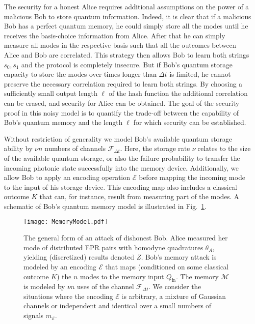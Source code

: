 \documentclass[aps,amsfonts,twoside,amssymb,superscriptaddress,twocolumn]{revtex4-1}
\newcommand*{\cE}{\mathcal{E}}
\newcommand*{\cF}{\mathcal{F}}
\newcommand*{\cM}{\mathcal{M}}
\newcommand*{\inn}{\textrm{in}}
\begin{document}
The security for a honest Alice requires additional assumptions on the power of a malicious Bob to store quantum information. 
Indeed, it is clear that if a malicious Bob has a perfect quantum memory, he could simply store all the modes until he receives the basis-choice information from Alice. 
After that he can simply measure all modes in the respective basis such that all the outcomes between Alice and Bob are correlated. 
This strategy then allows Bob to learn both strings $s_0,s_1$ and the protocol is completely insecure. 
But if Bob's quantum storage capacity to store the modes over times longer than $\Delta t$ is limited, he cannot preserve the necessary correlation required to learn both strings.
By choosing a sufficiently small output length $\ell$ of the hash function the additional correlation can be erased, and security for Alice can be obtained. 
The goal of the security proof in this noisy model is to quantify the trade-off between the capability of Bob's quantum memory and the length $\ell$ for which security can be established. 

Without restriction of generality we model Bob's available quantum storage ability by $\nu n$ numbers of channels $\cF_{\Delta t}$. Here, the storage rate $\nu$ relates to the size of the available quantum storage, or also the failure probability to transfer the incoming photonic state successfully into the memory device. Additionally, we allow Bob to apply an encoding operation $\cE$ before mapping the incoming mode to the input of his storage device. This encoding map also includes a classical outcome $K$ that can, for instance, result from measuring part of the modes. A schematic of Bob's quantum memory model is illustrated in Fig.~\ref{fig:Memory}. 

\begin{figure}
    \begin{center}
        \texttt{[image: MemoryModel.pdf]}
        \caption{The general form of an attack of dishonest Bob. Alice measured her mode of distributed EPR pairs with homodyne quadratures $\theta_A$, yielding (discretized) results denoted $Z$. Bob's memory attack is modeled by an encoding $\cE$ that maps (conditioned on some classical outcome $K$) the $n$ modes to the memory input $Q_{\inn}$. The memory $\cM$ is modeled by $\nu n$ uses of the channel $\cF_{\Delta t}$.  We consider the situations where the encoding $\cE$ is arbitrary, a mixture of Gaussian channels or independent and identical over a small numbers of signals $m_\cE$.
        }
        \label{fig:Memory}
    \end{center}
\end{figure}
\end{document}
